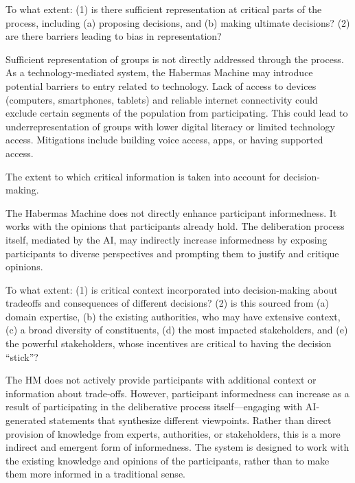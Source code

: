     \begin{evaluate}[grey]
        To what extent: (1) is there sufficient representation at critical parts of the process, including (a) proposing decisions, and (b) making ultimate decisions? (2) are there barriers leading to bias in representation?
    \end{evaluate}

    Sufficient representation of groups is not directly addressed through the process. As a technology-mediated system, the Habermas Machine may introduce potential barriers to entry related to technology. Lack of access to devices (computers, smartphones, tablets) and reliable internet connectivity could exclude certain segments of the population from participating. This could lead to underrepresentation of groups with lower digital literacy or limited technology access. Mitigations include building voice access, apps, or having supported access.
    

    \begin{describe}[grey]
        The extent to which critical information is taken into account for decision-making.
    \end{describe}

    The Habermas Machine does not directly enhance participant informedness. It works with the opinions that participants already hold. The deliberation process itself, mediated by the AI, may indirectly increase informedness by exposing participants to diverse perspectives and prompting them to justify and critique opinions.
    
    \begin{evaluate}[grey]
        To what extent: (1) is critical context incorporated into decision-making about tradeoffs and consequences of different decisions? (2) is this sourced from (a) domain expertise, (b) the existing authorities, who may have extensive context, (c) a broad diversity of constituents, (d) the most impacted stakeholders, and (e) the powerful stakeholders, whose incentives are critical to having the decision ``stick''?
    \end{evaluate}

    The HM does not actively provide participants with additional context or information about trade-offs. However, participant informedness can increase as a result of participating in the deliberative process itself---engaging with AI-generated statements that synthesize different viewpoints. Rather than direct provision of knowledge from experts, authorities, or stakeholders, this is a more indirect and emergent form of informedness. The system is designed to work with the existing knowledge and opinions of the participants, rather than to make them more informed in a traditional sense.


